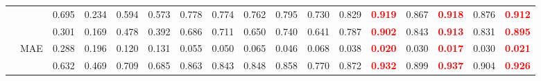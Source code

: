 \documentclass[runningheads]{llncs}
\begin{document}
\begin{table}[t]
{\begin{tabular}{@{}rl|ccccccccccc|cc|cc@{}}
    &             & 0.695                                     & 0.234                                       & 0.594                                       & 0.573                                  & 0.778                                      & 0.774                                          & 0.762                                      & 0.795                                        & 0.730                                            & 0.829                                      & \textcolor{red}{\textbf{0.919}} & 0.867                                          & \textcolor{red}{\textbf{0.918}} & 0.876                                     & \textcolor{red}{\textbf{0.912}} \\
    &  & 0.301                                     & 0.169                                       & 0.478                                       & 0.392                                  & 0.686                                      & 0.711                                          & 0.650                                      & 0.740                                        & 0.641                                            & 0.787                                      & \textcolor{red}{\textbf{0.902}} & 0.843                                          & \textcolor{red}{\textbf{0.913}} & 0.831                                     & \textcolor{red}{\textbf{0.895}} \\
    & MAE                  & 0.288                                     & 0.196                                       & 0.120                                       & 0.131                                  & 0.055                                      & 0.050                                          & 0.065                                      & 0.046                                        & 0.068                                            & 0.038                                      & \textcolor{red}{\textbf{0.020}} & 0.030                                          & \textcolor{red}{\textbf{0.017}} & 0.030                                     & \textcolor{red}{\textbf{0.021}} \\
    &               & 0.632                                     & 0.469                                       & 0.709                                       & 0.685                                  & 0.863                                      & 0.843                                          & 0.848                                      & 0.858                                        & 0.770                                            & 0.872                                      & \textcolor{red}{\textbf{0.932}} & 0.899                                          & \textcolor{red}{\textbf{0.937}} & 0.904                                     & \textcolor{red}{\textbf{0.926}} \\

\end{tabular}}
\end{table}
\end{document}
